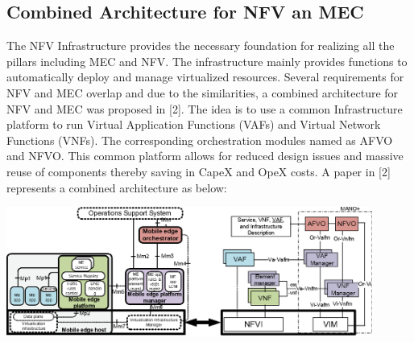 \subsection{Combined Architecture for NFV an MEC}

	The NFV Infrastructure provides the necessary foundation for realizing all the pillars including MEC and NFV. The infrastructure mainly provides functions to automatically deploy and manage virtualized resources. Several requirements for NFV and MEC overlap and due to the similarities, a combined architecture for NFV and MEC was proposed in [2]. The idea is to use a common Infrastructure platform to run Virtual Application Functions (VAFs) and Virtual Network Functions (VNFs). The corresponding orchestration modules named as AFVO and NFVO. This common platform allows for reduced design issues and massive reuse of components thereby saving in CapeX and OpeX costs. A paper in [2] represents a combined architecture as below:
	
\includegraphics[width=0.9\textwidth]{images/combined_architecture}
